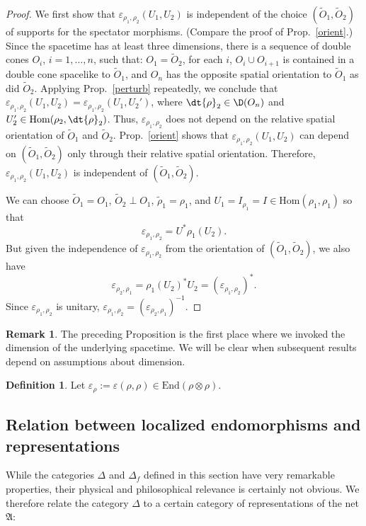 \documentclass[12pt]{article}
\newcommand{\alg}[1]{\mathfrak{#1}}
\theoremstyle{definition}
\theoremstyle{definition}
\newtheorem{defn}[thm]{Definition}
\newtheorem{note}[thm]{Remark}
\theoremstyle{remark}
\newcommand{\ve}{\varepsilon}
\def\wt#1{{\tilde #1}}
\newcommand{\Hom}{\mathrm{Hom}}
\begin{document}
\begin{proof} We first show that $\ve _{\rho _1,\rho _2}(U_1,U_2)$ is independent of
  the choice $(\wt O_1,\wt O_2)$ of supports for the spectator morphisms.  (Compare
  the proof of Prop.\ \ref{orient}.)  Since the spacetime has at least three
  dimensions, there is a sequence of double cones $O_{i}$, $i=1,\dots ,n$, such that:
  $O_1=\wt O_2$, for each $i$, $O_{i}\cup O_{i+1}$ is contained in a double cone
  spacelike to $\wt O_1$, and $O_{n}$ has the opposite spatial orientation to $\wt
  O_1$ as did $\wt O_2$.  Applying Prop.\ \ref{perturb} repeatedly, we conclude that
  $\ve _{\rho _1,\rho _2}(U_1,U_2)=\ve _{\rho _1,\rho _2}(U_1,U_2')$, where
  $\dt{\rho}_2\in \D (O_n)$ and $U_2'\in \Hom (\rho _2,\dt{\rho}_2)$.  Thus, $\ve
  _{\rho _1,\rho _2}$ does not depend on the relative spatial orientation of $\wt
  O_1$ and $\wt O_2$.  Prop.\ \ref{orient} shows that $\ve _{\rho _1,\rho
    _2}(U_1,U_2)$ can depend on $(\wt O_1,\wt O_2)$ only through their relative
  spatial orientation.  Therefore, $\ve _{\rho _1,\rho _2}(U_1,U_2)$ is independent
  of $(\wt O_1,\wt O_2)$.

  We can choose $\wt O_1=O_1$, $\wt O_2\perp O_1$, $\wt \rho _1=\rho _1$, and
  $U_1=I_{\rho _1}=I\in \Hom (\rho _1,\rho _1)$ so that
$$ \ve _{\rho _1,\rho _2}=U^*\rho _1(U_2). $$
But given the independence of $\ve _{\rho _1,\rho _2}$ from the orientation of $(\wt
O_1,\wt O_2)$, we also have
$$ \ve _{\rho _2,\rho _1}=\rho _1(U_2)^*U_2 =(\ve _{\rho _1,\rho _2})^* .$$  
Since $\ve _{\rho _1,\rho _2}$ is unitary, $\ve _{\rho _1,\rho _2}=(\ve _{\rho
  _2,\rho _1})^{-1}$.  \end{proof}

\begin{note} The preceding Proposition is the first place where we invoked the
  dimension of the underlying spacetime.  We will be clear when subsequent results
  depend on assumptions about dimension.  \end{note}

\begin{defn} Let $\ve _\rho := \ve (\rho ,\rho )\in \mathrm{End}(\rho \otimes \rho)$.
\end{defn}


\subsection{Relation between localized endomorphisms
  and representations} \label{ss-dhr} While the
categories $\Delta$ and $\Delta_f$ defined in this
section have very remarkable properties, their physical
and philosophical relevance is certainly not
obvious. We therefore relate the category $\Delta$ to a
certain category of representations of the net
$\alg{\alg{A}}$:
\end{document}
